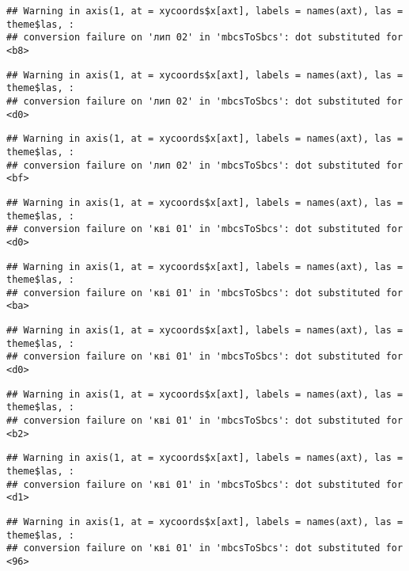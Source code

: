 \documentclass[]{article}
\begin{document}
\begin{verbatim}
## Warning in axis(1, at = xycoords$x[axt], labels = names(axt), las = theme$las, :
## conversion failure on 'лип 02' in 'mbcsToSbcs': dot substituted for <b8>
\end{verbatim}

\begin{verbatim}
## Warning in axis(1, at = xycoords$x[axt], labels = names(axt), las = theme$las, :
## conversion failure on 'лип 02' in 'mbcsToSbcs': dot substituted for <d0>
\end{verbatim}

\begin{verbatim}
## Warning in axis(1, at = xycoords$x[axt], labels = names(axt), las = theme$las, :
## conversion failure on 'лип 02' in 'mbcsToSbcs': dot substituted for <bf>
\end{verbatim}

\begin{verbatim}
## Warning in axis(1, at = xycoords$x[axt], labels = names(axt), las = theme$las, :
## conversion failure on 'кві 01' in 'mbcsToSbcs': dot substituted for <d0>
\end{verbatim}

\begin{verbatim}
## Warning in axis(1, at = xycoords$x[axt], labels = names(axt), las = theme$las, :
## conversion failure on 'кві 01' in 'mbcsToSbcs': dot substituted for <ba>
\end{verbatim}

\begin{verbatim}
## Warning in axis(1, at = xycoords$x[axt], labels = names(axt), las = theme$las, :
## conversion failure on 'кві 01' in 'mbcsToSbcs': dot substituted for <d0>
\end{verbatim}

\begin{verbatim}
## Warning in axis(1, at = xycoords$x[axt], labels = names(axt), las = theme$las, :
## conversion failure on 'кві 01' in 'mbcsToSbcs': dot substituted for <b2>
\end{verbatim}

\begin{verbatim}
## Warning in axis(1, at = xycoords$x[axt], labels = names(axt), las = theme$las, :
## conversion failure on 'кві 01' in 'mbcsToSbcs': dot substituted for <d1>
\end{verbatim}

\begin{verbatim}
## Warning in axis(1, at = xycoords$x[axt], labels = names(axt), las = theme$las, :
## conversion failure on 'кві 01' in 'mbcsToSbcs': dot substituted for <96>
\end{verbatim}
\end{document}
